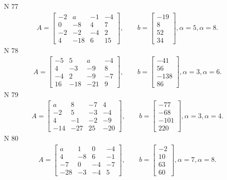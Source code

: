 \documentclass[11pt]{report}
\begin{document}
N 77
\begin{align*}
 A = \left[\begin{matrix}-2 & a & -1 & -4\\0 & -8 & 4 & 7\\-2 & -2 & -4 & 2\\4 & -18 & 6 & 15\end{matrix}\right],
    \qquad b = \left[\begin{matrix}-19\\8\\52\\34\end{matrix}\right], \alpha = 5, \alpha = 8. 
 \end{align*}
N 78
\begin{align*}
 A = \left[\begin{matrix}-5 & 5 & a & -4\\4 & -3 & -9 & 8\\-4 & 2 & -9 & -7\\16 & -18 & -21 & 9\end{matrix}\right],
    \qquad b = \left[\begin{matrix}-41\\56\\-138\\86\end{matrix}\right], \alpha = 3, \alpha = 6. 
 \end{align*}
N 79
\begin{align*}
 A = \left[\begin{matrix}a & 8 & -7 & 4\\-2 & 5 & -3 & -4\\4 & -1 & -2 & -9\\-14 & -27 & 25 & -20\end{matrix}\right],
    \qquad b = \left[\begin{matrix}-77\\-68\\-101\\220\end{matrix}\right], \alpha = 3, \alpha = 4. 
 \end{align*}
N 80
\begin{align*}
 A = \left[\begin{matrix}a & 1 & 0 & -4\\4 & -8 & 6 & -1\\-7 & 0 & -4 & -7\\-28 & -3 & -4 & 5\end{matrix}\right],
    \qquad b = \left[\begin{matrix}-2\\10\\63\\60\end{matrix}\right], \alpha = 7, \alpha = 8. 
 \end{align*}
\end{document}

